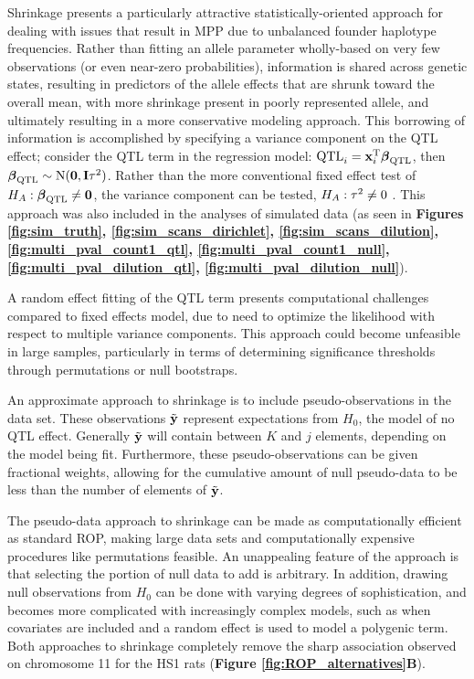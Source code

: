Shrinkage presents a particularly attractive statistically-oriented approach for dealing with issues that result in MPP due to unbalanced founder haplotype frequencies. Rather than fitting an allele parameter wholly-based on very few observations (or even near-zero probabilities), information is shared across genetic states, resulting in predictors of the allele effects that are shrunk toward the overall mean, with more shrinkage present in poorly represented allele, and ultimately resulting in a more conservative modeling approach. This borrowing of information is accomplished by specifying a variance component on the QTL effect; consider the QTL term in the regression model: $\text{QTL}_{i} = \mathbf{x}_{i}^{\text{T}}\boldsymbol{\beta}_{\text{QTL}}$, then $\boldsymbol{\beta}_{\text{QTL}} \sim \text{N}(\mathbf{0}, \mathbf{I}\tau^{2})$. Rather than the more conventional fixed effect test of $H_{A}: \boldsymbol{\beta}_{\text{QTL}} \neq \mathbf{0}$, the variance component can be tested, $H_{A}: \tau^{2} \neq 0$ \citep{Wei2016}. This approach was also included in the analyses of simulated data (as seen in \textbf{Figures \ref{fig:sim_truth}, \ref{fig:sim_scans_dirichlet}, \ref{fig:sim_scans_dilution}, \ref{fig:multi_pval_count1_qtl}, \ref{fig:multi_pval_count1_null}, \ref{fig:multi_pval_dilution_qtl}, \ref{fig:multi_pval_dilution_null}}).

A random effect fitting of the QTL term presents computational challenges compared to fixed effects model, due to need to optimize the likelihood with respect to multiple variance components. This approach could become unfeasible in large samples, particularly in terms of determining significance thresholds through permutations or null bootstraps.

An approximate approach to shrinkage is to include pseudo-observations in the data set. These observations $\tilde{\mathbf{y}}$ represent expectations from $H_{0}$, the model of no QTL effect. Generally $\tilde{\mathbf{y}}$ will contain between $K$ and $j$ elements, depending on the model being fit. Furthermore, these pseudo-observations can be given fractional weights, allowing for the cumulative amount of null pseudo-data to be less than the number of elements of $\tilde{\mathbf{y}}$.

The pseudo-data approach to shrinkage can be made as computationally efficient as standard ROP, making large data sets and computationally expensive procedures like permutations feasible. An unappealing feature of the approach is that selecting the portion of null data to add is arbitrary. In addition, drawing null observations from $H_{0}$ can be done with varying degrees of sophistication, and becomes more complicated with increasingly complex models, such as when covariates are included and a random effect is used to model a polygenic term. Both approaches to shrinkage completely remove the sharp association observed on chromosome 11 for the HS1 rats (\textbf{Figure \ref{fig:ROP_alternatives}B}).


